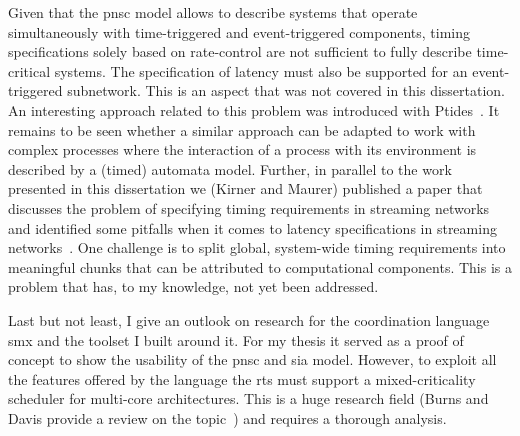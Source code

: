 Given that the \gls{pnsc} model allows to describe systems that operate simultaneously with time-triggered and event-triggered components, timing specifications solely based on rate-control are not sufficient to fully describe time-critical systems.
The specification of latency must also be supported for an event-triggered subnetwork.
This is an aspect that was not covered in this dissertation.
An interesting approach related to this problem was introduced with Ptides~\cite{derler2008}.
It remains to be seen whether a similar approach can be adapted to work with complex processes where the interaction of a process with its environment is described by a (timed) automata model.
Further, in parallel to the work presented in this dissertation we (Kirner and Maurer) published a paper that discusses the problem of specifying timing requirements in streaming networks and identified some pitfalls when it comes to latency specifications in streaming networks~\cite{kirner2015}.
One challenge is to split global, system-wide timing requirements into meaningful chunks that can be attributed to computational components.
This is a problem that has, to my knowledge, not yet been addressed.

Last but not least, I give an outlook on research for the coordination language \gls*{smx} and the toolset I built around it.
For my thesis it served as a proof of concept to show the usability of the \gls{pnsc} and \gls{sia} model.
However, to exploit all the features offered by the language the \gls{rts} must support a mixed-criticality scheduler for multi-core architectures.
This is a huge research field (Burns and Davis provide a review on the topic~\cite{burns2016}) and requires a thorough analysis.
